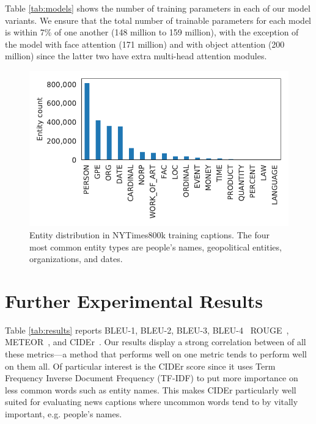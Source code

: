 \documentclass[10pt,twocolumn,letterpaper]{article}
\begin{document}
Table \ref{tab:models} shows the number of training parameters in each of our
model variants. We ensure that the total number of trainable parameters for
each model is within 7\% of one another (148 million to 159 million), with the
exception of the model with face attention (171 million) and with object
attention (200 million) since the latter two have extra multi-head attention
modules.

\begin{figure}[t]
   \begin{center}
      \includegraphics[width=0.99\linewidth]{figures/figure_2_entities.pdf}
   \end{center}
   \caption{Entity distribution in NYTimes800k training captions. The four
      most common entity types are people's names, geopolitical
      entities, organizations, and dates.}
   \label{fig:entities}
\end{figure}



\section{Further Experimental Results}

Table \ref{tab:results} reports BLEU-1, BLEU-2, BLEU-3,
BLEU-4~\cite{Papineni2002Bleu} ROUGE~\cite{Lin2004ROUGE},
METEOR~\cite{Denkowski2014Meteor}, and CIDEr~\cite{Vedantam2015CIDEr}. Our
results display a strong correlation between of all these metrics---a method
that performs well on one metric tends to perform well on them all. Of
particular interest is the CIDEr score since it uses Term Frequency Inverse
Document Frequency (TF-IDF) to put more importance on less common words such as
entity names. This makes CIDEr particularly well suited for evaluating news
captions where uncommon words tend to by vitally important, e.g. people's
names.
\end{document}
